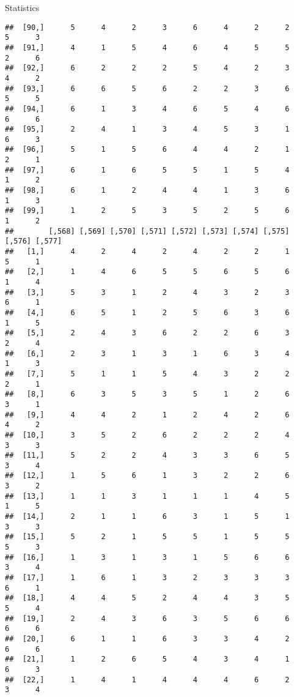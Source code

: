 \documentclass[
  ignorenonframetext,
]{beamer}
\begin{document}
\begin{frame}[fragile]{Statistics}
\begin{verbatim}
##  [90,]      5      4      2      3      6      4      2      2      5      3
##  [91,]      4      1      5      4      6      4      5      5      2      6
##  [92,]      6      2      2      2      5      4      2      3      4      2
##  [93,]      6      6      5      6      2      2      3      6      5      5
##  [94,]      6      1      3      4      6      5      4      6      6      6
##  [95,]      2      4      1      3      4      5      3      1      6      3
##  [96,]      5      1      5      6      4      4      2      1      2      1
##  [97,]      6      1      6      5      5      1      5      4      1      2
##  [98,]      6      1      2      4      4      1      3      6      1      3
##  [99,]      1      2      5      3      5      2      5      6      1      2
##        [,568] [,569] [,570] [,571] [,572] [,573] [,574] [,575] [,576] [,577]
##   [1,]      4      2      4      2      4      2      2      1      5      1
##   [2,]      1      4      6      5      5      6      5      6      1      4
##   [3,]      5      3      1      2      4      3      2      3      6      1
##   [4,]      6      5      1      2      5      6      3      6      1      5
##   [5,]      2      4      3      6      2      2      6      3      2      4
##   [6,]      2      3      1      3      1      6      3      4      1      3
##   [7,]      5      1      1      5      4      3      2      2      2      1
##   [8,]      6      3      5      3      5      1      2      6      3      1
##   [9,]      4      4      2      1      2      4      2      6      4      2
##  [10,]      3      5      2      6      2      2      2      4      3      3
##  [11,]      5      2      2      4      3      3      6      5      3      4
##  [12,]      1      5      6      1      3      2      2      6      3      2
##  [13,]      1      1      3      1      1      1      4      5      1      5
##  [14,]      2      1      1      6      3      1      5      1      3      3
##  [15,]      5      2      1      5      5      1      5      5      5      3
##  [16,]      1      3      1      3      1      5      6      6      3      4
##  [17,]      1      6      1      3      2      3      3      3      6      1
##  [18,]      4      4      5      2      4      4      3      5      5      4
##  [19,]      2      4      3      6      3      5      6      6      6      6
##  [20,]      6      1      1      6      3      3      4      2      6      6
##  [21,]      1      2      6      5      4      3      4      1      6      3
##  [22,]      1      4      1      4      4      4      6      2      3      4

\end{verbatim}
\end{frame}
\end{document}

